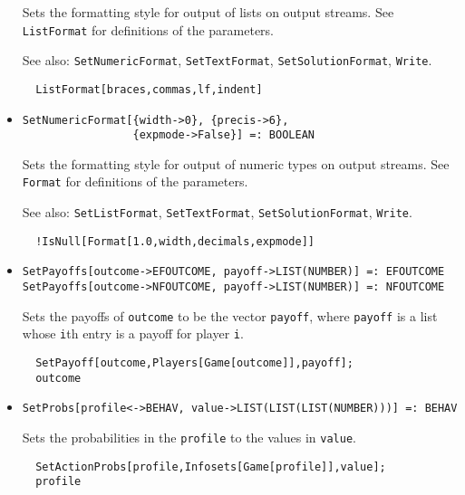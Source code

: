 \begin{itemize}
\bd
Sets the formatting style for output of lists on output streams. See
\verb+ListFormat+ for definitions of the parameters. 
\item [See also:] \verb+SetNumericFormat+, \verb+SetTextFormat+,
\verb+SetSolutionFormat+, \verb+Write+.
\begin{verbatim}
  ListFormat[braces,commas,lf,indent]
\end{verbatim} 
\ed

\item{}
\protect \large \begin{verbatim}
SetNumericFormat[{width->0}, {precis->6}, 
                 {expmode->False}] =: BOOLEAN 
\end{verbatim}\normalsize

\bd Sets the formatting style for output of numeric types on output
streams.  See \verb+Format+ for definitions of the parameters.
\item [See also:] \verb+SetListFormat+, \verb+SetTextFormat+, 
\verb+SetSolutionFormat+, \verb+Write+.
\begin{verbatim}
  !IsNull[Format[1.0,width,decimals,expmode]]
\end{verbatim} 
\ed

\item{}
\protect \large \begin{verbatim}
SetPayoffs[outcome->EFOUTCOME, payoff->LIST(NUMBER)] =: EFOUTCOME 
SetPayoffs[outcome->NFOUTCOME, payoff->LIST(NUMBER)] =: NFOUTCOME 
\end{verbatim}\normalsize
 
\bd 

Sets the payoffs of \verb+outcome+ to be the vector \verb+payoff+,
where \verb+payoff+ is a list whose \verb+i+th entry is a payoff for
player \verb+i+.
\begin{verbatim}
  SetPayoff[outcome,Players[Game[outcome]],payoff];
  outcome
\end{verbatim} 
\ed

\item{}
\protect \large \begin{verbatim}
SetProbs[profile<->BEHAV, value->LIST(LIST(LIST(NUMBER)))] =: BEHAV 
\end{verbatim}\normalsize

\bd 
Sets the probabilities in the \verb+profile+ to the values in
\verb+value+.  
\begin{verbatim}
  SetActionProbs[profile,Infosets[Game[profile]],value];
  profile
\end{verbatim} 
\ed


\end{itemize}
